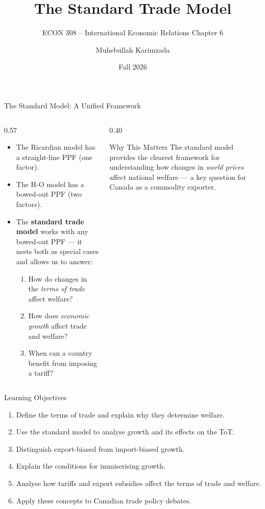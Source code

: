 \documentclass[aspectratio=169]{beamer}
\title{\textbf{The Standard Trade Model}}
\subtitle{{\large ECON 308 -- International Economic Relations \quad Chapter 6}}
\author{Muhebullah Karimzada}
\institute{School of Economics \\ University of Northern British Columbia}
\date{Fall 2026}
\begin{document}
\begin{frame}[plain]\titlepage\end{frame}

\begin{frame}{The Standard Model: A Unified Framework}
\begin{columns}
\begin{column}{0.57\textwidth}
\begin{itemize}
  \item The Ricardian model has a straight-line PPF (one factor).
  \item The H-O model has a bowed-out PPF (two factors).
  \item The \textbf{standard trade model} works with any bowed-out PPF --- it nests both as special cases and allows us to answer:
    \begin{enumerate}
      \item How do changes in the \emph{terms of trade} affect welfare?
      \item How does \emph{economic growth} affect trade and welfare?
      \item When can a country benefit from imposing a tariff?
    \end{enumerate}
\end{itemize}
\end{column}
\begin{column}{0.40\textwidth}
\begin{insight}{Why This Matters}
  The standard model provides the clearest framework for understanding how changes in \emph{world prices} affect national welfare --- a key question for Canada as a commodity exporter.
\end{insight}
\end{column}
\end{columns}
\end{frame}

\begin{frame}{Learning Objectives}
\begin{enumerate}
  \item Define the terms of trade and explain why they determine welfare.
  \item Use the standard model to analyse growth and its effects on the ToT.
  \item Distinguish export-biased from import-biased growth.
  \item Explain the conditions for immiserising growth.
  \item Analyse how tariffs and export subsidies affect the terms of trade and welfare.
  \item Apply these concepts to Canadian trade policy debates.
\end{enumerate}
\end{frame}
\end{document}
